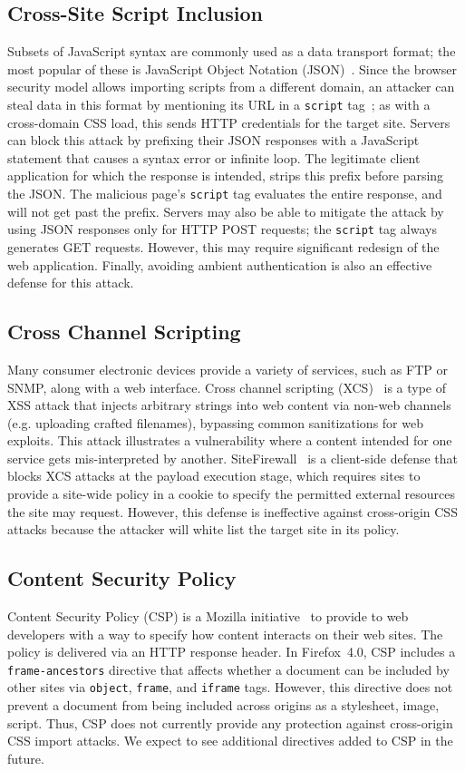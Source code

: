 \documentclass{sig-alternate}
\begin{document}
\subsection{Cross-Site Script Inclusion} \label{sec:json}
Subsets of JavaScript syntax are commonly used as a data transport
format; the most popular of these is JavaScript Object Notation
(JSON)~\cite{json}.  Since the browser security model allows importing
scripts from a different domain, an attacker can steal data in this
format by mentioning its URL in a \texttt{script}
tag~\cite{jshijacking}; as with a cross-domain CSS load, this sends
HTTP credentials for the target site.  Servers can block this attack
by prefixing their JSON responses with a JavaScript statement that
causes a syntax error or infinite loop.  The legitimate client
application for which the response is intended, strips this prefix
before parsing the JSON.  The malicious page's \texttt{script} tag
evaluates the entire response, and will not get past the prefix.
Servers may also be able to mitigate the attack by using JSON
responses only for HTTP POST requests; the \texttt{script} tag always
generates GET requests.  However, this may require significant
redesign of the web application.  Finally, avoiding ambient
authentication is also an effective defense for this attack.

\subsection{Cross Channel Scripting}
Many consumer electronic devices provide a variety of services, such as FTP or
SNMP, along with a web interface. Cross channel scripting (XCS)~\cite{xcs} is a
type of XSS attack that injects arbitrary strings into web content via non-web
channels (e.g. uploading crafted filenames), bypassing common sanitizations for
web exploits. This attack illustrates a vulnerability where a content intended
for one service gets mis-interpreted by another. SiteFirewall~\cite{xcs} is a
client-side defense that blocks XCS attacks at the payload execution stage,
which requires sites to provide a site-wide policy in a cookie to specify the
permitted external resources the site may request. However, this defense is
ineffective against cross-origin CSS attacks because the attacker will white
list the target site in its policy.

\subsection{Content Security Policy}
Content Security Policy (CSP) is a Mozilla initiative~\cite{csp} to provide to
web developers with a way to specify how content interacts on their web sites.
The policy is delivered via an HTTP response header. In Firefox~4.0, CSP
includes a \verb|frame-ancestors| directive that affects whether a document
can be included by other sites via \verb|object|, \verb|frame|, and
\verb|iframe| tags. However, this directive does not prevent a document from
being included across origins as a stylesheet, image, script. Thus, CSP does
not currently provide any protection against cross-origin CSS import attacks. We expect to see additional directives added to CSP in the future.
\end{document}
